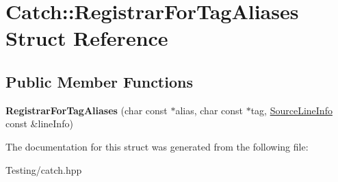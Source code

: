 \hypertarget{struct_catch_1_1_registrar_for_tag_aliases}{\section{Catch\-:\-:Registrar\-For\-Tag\-Aliases Struct Reference}
\label{struct_catch_1_1_registrar_for_tag_aliases}
}
\subsection*{Public Member Functions}
\begin{DoxyCompactItemize}
\item 
\hypertarget{struct_catch_1_1_registrar_for_tag_aliases_ae4e45830e4763bcd65d55d8db9167b69}{{\bfseries Registrar\-For\-Tag\-Aliases} (char const $\ast$alias, char const $\ast$tag, \hyperlink{struct_catch_1_1_source_line_info}{Source\-Line\-Info} const \&line\-Info)}\label{struct_catch_1_1_registrar_for_tag_aliases_ae4e45830e4763bcd65d55d8db9167b69}

\end{DoxyCompactItemize}


The documentation for this struct was generated from the following file\-:\begin{DoxyCompactItemize}
\item 
Testing/catch.\-hpp\end{DoxyCompactItemize}
